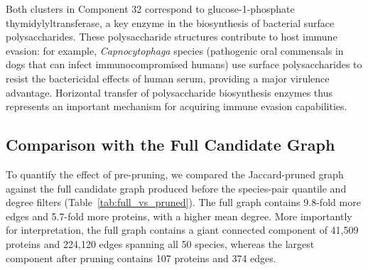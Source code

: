 \documentclass[11pt]{article}
\begin{document}
Both clusters in Component 32 correspond to glucose-1-phosphate thymidylyltransferase, a key enzyme in the biosynthesis of bacterial surface polysaccharides. These polysaccharide structures contribute to host immune evasion: for example, \textit{Capnocytophaga} species (pathogenic oral commensals in dogs that can infect immunocompromised humans) use surface polysaccharides to resist the bactericidal effects of human serum, providing a major virulence advantage\cite{CompA1,CompA2,CompA3}. Horizontal transfer of polysaccharide biosynthesis enzymes thus represents an important mechanism for acquiring immune evasion capabilities.

\subsection{Comparison with the Full Candidate Graph}

To quantify the effect of pre-pruning, we compared the Jaccard-pruned graph against the full candidate graph produced before the species-pair quantile and degree filters (Table~\ref{tab:full_vs_pruned}). The full graph contains 9.8-fold more edges and 5.7-fold more proteins, with a higher mean degree. More importantly for interpretation, the full graph contains a giant connected component of 41,509 proteins and 224,120 edges spanning all 50 species, whereas the largest component after pruning contains 107 proteins and 374 edges.

\begin{table}[ht]
\centering
\small
\setlength{\tabcolsep}{5pt}
\caption{Structural comparison of the full candidate graph and the Jaccard-pruned graph. Mean degree is $2|E|/|V|$. The high-$z$ fraction is computed within the largest connected component of each graph using the same species-pair robust normalization threshold ($z \ge 3$).}
\label{tab:full_vs_pruned}
\end{table}
\end{document}
